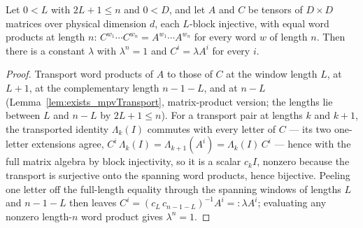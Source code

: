 \begin{lemma}%
    \label{lem:proportional_of_evalWord_eq}
    \leanok
    Let $0 < L$ with $2L + 1 \le n$ and $0 < D$, and let $A$ and $C$ be
    tensors of $D \times D$ matrices over physical dimension $d$, each
    $L$-block injective, with equal word products at length $n$:
    $C^{w_1} \cdots C^{w_n} = A^{w_1} \cdots A^{w_n}$ for every word $w$ of
    length $n$.  Then there is a constant $\lambda$ with $\lambda^n = 1$
    and $C^i = \lambda A^i$ for every $i$.
\end{lemma}
\begin{proof}\leanok
    Transport word products of $A$ to those of $C$ at the window length
    $L$, at $L + 1$, at the complementary length $n - 1 - L$, and at
    $n - L$ (Lemma~\ref{lem:exists_mpvTransport}, matrix-product version;
    the lengths lie between $L$ and $n - L$ by $2L + 1 \le n$).  For a
    transport pair at lengths $k$ and $k + 1$, the transported identity
    $\Lambda_k(I)$ commutes with every letter of $C$ — its two one-letter
    extensions agree, $C^i\,\Lambda_k(I) = \Lambda_{k+1}(A^i) =
        \Lambda_k(I)\,C^i$ — hence with the full matrix algebra by block
    injectivity, so it is a scalar $c_k I$, nonzero because the transport
    is surjective onto the spanning word products, hence bijective.
    Peeling one letter off the full-length equality through the spanning
    windows of lengths $L$ and $n - 1 - L$ then leaves
    $C^i = (c_L\,c_{n-1-L})^{-1} A^i =: \lambda A^i$; evaluating any
    nonzero length-$n$ word product gives $\lambda^n = 1$.
\end{proof}

